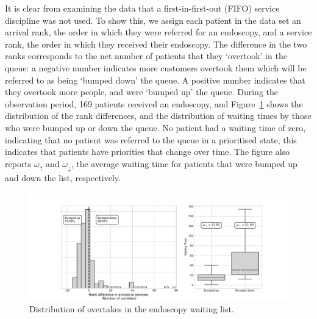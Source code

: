 \documentclass{article}
\begin{document}
It is clear from examining the data that a first-in-first-out (FIFO) service
discipline was not used. To show this, we assign each patient in the data set
an arrival rank, the order in which they were referred for an endoscopy, and a
service rank, the order in which they received their endoscopy. The difference
in the two ranks corresponds to the net number of patients that they `overtook'
in the queue: a negative number indicates more customers overtook them which
will be referred to as being `bumped down' the queue.
A positive number indicates that they overtook more people, and were `bumped up'
the queue. During the observation period, 169 patients received an endoscopy,
and Figure~\ref{fig:motivating_overtakes} shows the distribution of the rank
differences, and the distribution of waiting times by those who were bumped up
or down the queue. No patient had a waiting time of zero, indicating that no
patient was referred to the queue in a prioritised state, this indicates that
patients have priorities that change over time.
The figure also reports $\omega_{\uparrow}$ and $\omega_{\downarrow}$, the
average waiting time for patients that were bumped up and down the list,
respectively.

\begin{figure}
  \begin{center}
    \includegraphics[width=\textwidth]{img/motivating_overtakes.pdf}
  \end{center}
  \caption{Distribution of overtakes in the endoscopy waiting list.}
  \label{fig:motivating_overtakes}
\end{figure}
\end{document}
